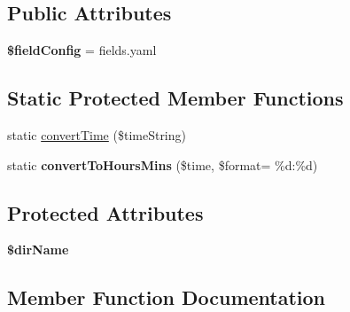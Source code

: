 \subsection*{Public Attributes}
\begin{DoxyCompactItemize}
\item 
\hypertarget{classDMA_1_1Friends_1_1Classes_1_1ActivityTypeBase_a6ead7996f0a00ff1109b45d6e6a7c10c}{}{\bfseries \$field\+Config} = \textquotesingle{}fields.\+yaml\textquotesingle{}\label{classDMA_1_1Friends_1_1Classes_1_1ActivityTypeBase_a6ead7996f0a00ff1109b45d6e6a7c10c}

\end{DoxyCompactItemize}
\subsection*{Static Protected Member Functions}
\begin{DoxyCompactItemize}
\item 
static \hyperlink{classDMA_1_1Friends_1_1Classes_1_1ActivityTypeBase_adb196a8d338da688f10f4a8da6480fd0}{convert\+Time} (\$time\+String)
\item 
\hypertarget{classDMA_1_1Friends_1_1Classes_1_1ActivityTypeBase_a55c02f7a26052ca8510360be1653c92a}{}static {\bfseries convert\+To\+Hours\+Mins} (\$time, \$format= \textquotesingle{}\%d\+:\%d\textquotesingle{})\label{classDMA_1_1Friends_1_1Classes_1_1ActivityTypeBase_a55c02f7a26052ca8510360be1653c92a}

\end{DoxyCompactItemize}
\subsection*{Protected Attributes}
\begin{DoxyCompactItemize}
\item 
\hypertarget{classDMA_1_1Friends_1_1Classes_1_1ActivityTypeBase_a3542383d50c238777642e2ec09c61bfb}{}{\bfseries \$dir\+Name}\label{classDMA_1_1Friends_1_1Classes_1_1ActivityTypeBase_a3542383d50c238777642e2ec09c61bfb}

\end{DoxyCompactItemize}


\subsection{Member Function Documentation}
\hypertarget{classDMA_1_1Friends_1_1Classes_1_1ActivityTypeBase_acc0d37915d9170364f381945fd01f7c2}{}
